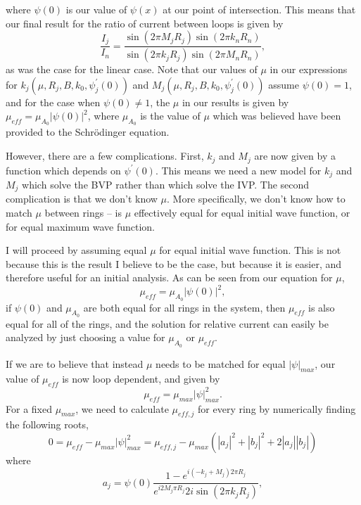 \documentclass[11pt]{article}
\begin{document}
where \(\psi(0)\) is our value of \(\psi(x)\) at our point of
intersection. This means that our final result for the ratio of current
between loops is given by \begin{equation}
\frac{I_j}{I_n} = \frac{\sin\left(2 \pi M_j R_j\right)\sin\left(2 \pi k_n R_n\right)}{\sin\left(2 \pi k_j R_j\right)\sin\left(2 \pi M_n R_n\right)},
\end{equation} as was the case for the linear case. Note that our values
of \(\mu\) in our expressions for
\(k_j\left(\mu, R_j, B, k_0, \psi^\prime_j(0) \right)\) and
\(M_j\left(\mu, R_j, B, k_0, \psi^\prime_j(0) \right)\) assume
\(\psi(0) = 1\), and for the case when \(\psi(0) \neq 1\), the \(\mu\)
in our results is given by
\(\mu_{eff} = \mu_{A_0} \left| \psi(0) \right|^2\), where \(\mu_{A_0}\)
is the value of \(\mu\) which was believed have been provided to the
Schrödinger equation.

However, there are a few complications. First, \(k_j\) and \(M_j\) are
now given by a function which depends on \(\psi^\prime(0)\). This means
we need a new model for \(k_j\) and \(M_j\) which solve the BVP rather
than which solve the IVP. The second complication is that we don't know
\(\mu\). More specifically, we don't know how to match \(\mu\) between
rings -- is \(\mu\) effectively equal for equal initial wave function,
or for equal maximum wave function.

I will proceed by assuming equal \(\mu\) for equal initial wave
function. This is not because this is the result I believe to be the
case, but because it is easier, and therefore useful for an initial
analysis. As can be seen from our equation for \(\mu\), \begin{equation}
\mu_{eff} = \mu_{A_0} \left| \psi(0) \right|^2,
\end{equation} if \(\psi(0)\) and \(\mu_{A_0}\) are both equal for all
rings in the system, then \(\mu_{eff}\) is also equal for all of the
rings, and the solution for relative current can easily be analyzed by
just choosing a value for \(\mu_{A_0}\) or \(\mu_{eff}\).

If we are to believe that instead \(\mu\) needs to be matched for equal
\(\left|\psi\right|_{max}\), our value of \(\mu_{eff}\) is now loop
dependent, and given by \begin{equation}
\mu_{eff} = \mu_{max} \left| \psi \right|_{max}^2.
\end{equation} For a fixed \(\mu_{max}\), we need to calculate
\(\mu_{eff, j}\) for every ring by numerically finding the following
roots, \begin{equation}
0 = \mu_{eff} - \mu_{max} \left| \psi \right| _{max}^2 = \mu_{eff, j} - \mu_{max} \left(\left| a_j \right|^2 + \left| b_j \right|^2 + 2 \left| a_j \right|\left| b_j \right|\right)
\end{equation} where \begin{equation}
a_j = \psi(0) \frac{1 - e^{i \left(-k_j + M_j \right) 2 \pi R_j}}{e^{i 2 M_j \pi R_j} 2 i \sin \left( 2 \pi k_j R_j \right)},
\end{equation}
\end{document}
